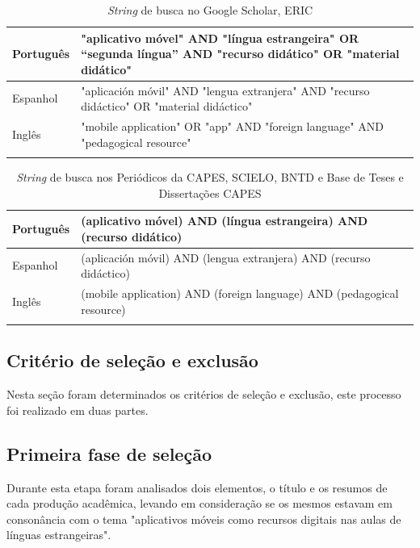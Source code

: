 \documentclass{textolivre}
\begin{document}
\begin{table}[htpb]
\caption{\emph{String} de busca no Google Scholar, ERIC}
\label{tab1}
\centering
\begin{tabular}{p{}p{}}
\toprule 
\arrayrulecolor[gray]{.7}
Português & "aplicativo móvel" AND "língua estrangeira" OR “segunda língua” AND "recurso didático" OR "material didático"
\\
\midrule
Espanhol & "aplicación móvil" AND "lengua extranjera" AND "recurso didáctico" OR "material didáctico"
\\
\midrule
Inglês & "mobile application" OR "app" AND "foreign language" AND "pedagogical resource"
\\ 
\arrayrulecolor{black}
\bottomrule
\end{tabular}
\centering
\end{table}

\begin{table}[htpb]
\caption{\textit{String} de busca nos Periódicos da CAPES, SCIELO, BNTD e Base de Teses e Dissertações CAPES}
\label{tab2}
\centering
\begin{tabular}{p{}p{}}
\toprule 
\arrayrulecolor[gray]{.7}
Português & (aplicativo móvel) AND (língua estrangeira) AND (recurso didático)
\\
\midrule
Espanhol & (aplicación móvil) AND (lengua extranjera) AND (recurso didáctico)
\\
\midrule
Inglês & (mobile application) AND (foreign language) AND (pedagogical resource)
\\ 
\arrayrulecolor{black}
\bottomrule
\end{tabular}
\centering
\end{table}

\subsection{Critério de seleção e exclusão}
Nesta seção foram determinados os critérios de seleção e exclusão, este processo foi realizado em duas partes.

\subsection*{Primeira fase de seleção}
Durante esta etapa foram analisados dois elementos, o título e os resumos de cada produção acadêmica, levando em consideração se os mesmos estavam em consonância com o tema "aplicativos móveis como recursos digitais nas aulas de línguas estrangeiras".
\end{document}
